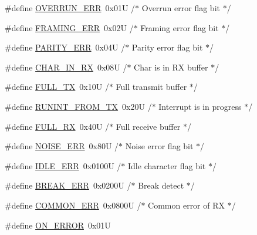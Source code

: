 \begin{DoxyCompactItemize}
\item 
\#define \hyperlink{group___a_s2__module_ga59f58864bb61f9450d236b712214a9d0}{O\+V\+E\+R\+R\+U\+N\+\_\+\+E\+RR}~0x01\+U         /$\ast$ Overrun error flag bit    $\ast$/
\item 
\#define \hyperlink{group___a_s2__module_ga19cf3fb3576b5fa62d2a0d781e2a724b}{F\+R\+A\+M\+I\+N\+G\+\_\+\+E\+RR}~0x02\+U         /$\ast$ Framing error flag bit    $\ast$/
\item 
\#define \hyperlink{group___a_s2__module_gac8a34f3fae782b1f62195c0d8f1d5d38}{P\+A\+R\+I\+T\+Y\+\_\+\+E\+RR}~0x04\+U         /$\ast$ Parity error flag bit     $\ast$/
\item 
\#define \hyperlink{group___a_s2__module_ga99960abe909f47f501b4c31003fbcade}{C\+H\+A\+R\+\_\+\+I\+N\+\_\+\+RX}~0x08\+U         /$\ast$ Char is in R\+X buffer      $\ast$/
\item 
\#define \hyperlink{group___a_s2__module_ga4642a25898b62e449c4f53559e7fdd5a}{F\+U\+L\+L\+\_\+\+TX}~0x10\+U         /$\ast$ Full transmit buffer      $\ast$/
\item 
\#define \hyperlink{group___a_s2__module_gaf4dcc39d70d3e855818d2a06f0f88adc}{R\+U\+N\+I\+N\+T\+\_\+\+F\+R\+O\+M\+\_\+\+TX}~0x20\+U         /$\ast$ Interrupt is in progress  $\ast$/
\item 
\#define \hyperlink{group___a_s2__module_ga548b5122de8b4aa86a3098e1a45c447f}{F\+U\+L\+L\+\_\+\+RX}~0x40\+U         /$\ast$ Full receive buffer       $\ast$/
\item 
\#define \hyperlink{group___a_s2__module_ga826432ddfcc8e042fb9781a5b325d962}{N\+O\+I\+S\+E\+\_\+\+E\+RR}~0x80\+U         /$\ast$ Noise error flag bit      $\ast$/
\item 
\#define \hyperlink{group___a_s2__module_ga4584e89e739c19496724ba117e62aed9}{I\+D\+L\+E\+\_\+\+E\+RR}~0x0100\+U       /$\ast$ Idle character flag bit   $\ast$/
\item 
\#define \hyperlink{group___a_s2__module_ga0cb4d61ee3347eb62142ca0eb1d02a53}{B\+R\+E\+A\+K\+\_\+\+E\+RR}~0x0200\+U       /$\ast$ Break detect              $\ast$/
\item 
\#define \hyperlink{group___a_s2__module_ga86e7d2a6a6227d9fbb84d459454c2359}{C\+O\+M\+M\+O\+N\+\_\+\+E\+RR}~0x0800\+U       /$\ast$ Common error of R\+X       $\ast$/
\item 
\#define \hyperlink{group___a_s2__module_gab5034f048fef6a41e7901a4e34368f3d}{O\+N\+\_\+\+E\+R\+R\+OR}~0x01U
\item 

\end{DoxyCompactItemize}
